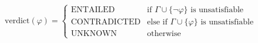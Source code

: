 \documentclass[border=3pt,varwidth=16cm]{standalone}
\begin{document}
$\displaystyle \mathrm{verdict}(\varphi) = \begin{cases} \text{ENTAILED} & \text{if } \Gamma \cup \{\neg\varphi\} \text{ is unsatisfiable} \\ \text{CONTRADICTED} & \text{else if } \Gamma \cup \{\varphi\} \text{ is unsatisfiable} \\ \text{UNKNOWN} & \text{otherwise} \end{cases}$
\end{document}
